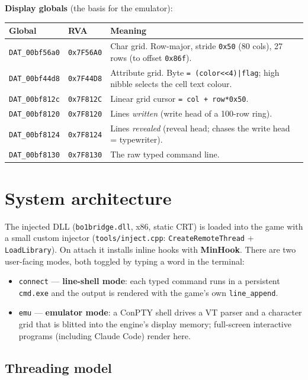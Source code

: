 \documentclass[11pt]{article}
\newcommand{\ic}[1]{\texttt{#1}}
\begin{document}
\noindent\textbf{Display globals} (the basis for the emulator):

\begin{longtable}{@{}llp{8.5cm}@{}}
\toprule
\textbf{Global} & \textbf{RVA} & \textbf{Meaning} \\
\midrule
\texttt{DAT_00bf56a0} & \texttt{0x7F56A0} & Char grid. Row-major, stride \texttt{0x50} (80 cols), 27 rows (to offset \texttt{0x86f}). \\
\texttt{DAT_00bf44d8} & \texttt{0x7F44D8} & Attribute grid. Byte \ic{= (color<<4)|flag}; high nibble selects the cell text colour. \\
\texttt{DAT_00bf812c} & \texttt{0x7F812C} & Linear grid cursor \ic{= col + row*0x50}. \\
\texttt{DAT_00bf8120} & \texttt{0x7F8120} & Lines \emph{written} (write head of a 100-row ring). \\
\texttt{DAT_00bf8124} & \texttt{0x7F8124} & Lines \emph{revealed} (reveal head; chases the write head = typewriter). \\
\texttt{DAT_00bf8130} & \texttt{0x7F8130} & The raw typed command line. \\
\bottomrule
\end{longtable}

\section{System architecture}

The injected DLL (\texttt{bo1bridge.dll}, x86, static CRT) is loaded into the game
with a small custom injector (\texttt{tools/inject.cpp}: \texttt{CreateRemoteThread}
+ \texttt{LoadLibrary}). On attach it installs inline hooks with \textbf{MinHook}.
There are two user-facing modes, both toggled by typing a word in the terminal:

\begin{itemize}[nosep]
  \item \texttt{connect} --- \textbf{line-shell mode}: each typed command runs in a
  persistent \texttt{cmd.exe} and the output is rendered with the game's own
  \texttt{line_append}.
  \item \texttt{emu} --- \textbf{emulator mode}: a ConPTY shell drives a VT parser and
  a character grid that is blitted into the engine's display memory; full-screen
  interactive programs (including Claude Code) render here.
\end{itemize}

\subsection{Threading model}
\end{document}
